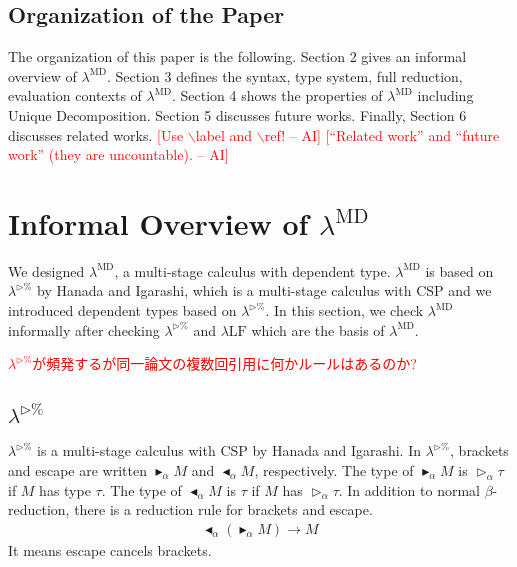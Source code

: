 \documentclass[runningheads]{llncs}
\newcommand{\red}[1]{\textcolor{red}{#1 }}
\newcommand{\LTP}{$\lambda^{\triangleright\%}$\xspace}
\newcommand{\LMD}{$\lambda^{\textrm{MD}}$\xspace}
\newcommand{\LLF}{$\lambda\textrm{LF}$\xspace}
\newcommand{\TW}{{\mathop{\triangleright}}}
\newcommand{\TB}{{\mathop{\blacktriangleright}}}
\newcommand{\TBL}{{\mathop{\blacktriangleleft}}}
\newcommand{\AI}[1]{\textcolor{red}{[#1 -- AI]}}
\begin{document}
\subsection{Organization of the Paper}

The organization of this paper is the following.
Section 2 gives an informal overview of \LMD.
Section 3 defines the syntax, type system, full reduction, evaluation contexts of \LMD.
Section 4 shows the properties of \LMD including Unique Decomposition.
Section 5 discusses future works.
Finally, Section 6 discusses related works.
\AI{Use $\backslash$label and $\backslash$ref!}
\AI{``Related work'' and ``future work'' (they are uncountable).}

\section{Informal Overview of \LMD}

We designed \LMD, a multi-stage calculus with dependent type.
\LMD is based on \LTP\cite{Hanada2014} by Hanada and Igarashi, which is a multi-stage calculus with CSP and
we introduced dependent types based on \LTP\cite{attapl}.
In this section, we check \LMD informally after checking \LTP and \LLF which are the basis of \LMD.

\red{\LTP\cite{Hanada2014}が頻発するが同一論文の複数回引用に何かルールはあるのか?}
\subsection{\LTP}


\LTP\cite{Hanada2014} is a multi-stage calculus with CSP by Hanada and Igarashi.
In \LTP, brackets and escape are written $\TB_\alpha M$ and $\TBL_\alpha M$, respectively.
The type of $\TB_\alpha M$ is $\TW_\alpha \tau$ if $M$ has type $\tau$.
The type of $\TBL_\alpha M$ is $\tau$ if $M$ has $\TW_\alpha \tau$.
In addition to normal $\beta$-reduction, there is a reduction rule for brackets and escape.
\begin{align*}
    \TBL_\alpha (\TB_\alpha M) \longrightarrow M 
\end{align*}
It means escape cancels brackets.

\end{document}
